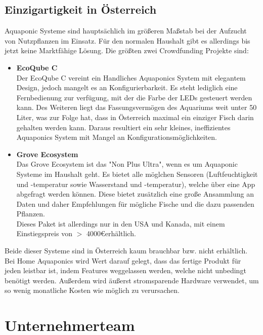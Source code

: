 \documentclass[11pt]{article}
\begin{document}
\subsection{Einzigartigkeit in \"Osterreich}
Aquaponic Systeme sind haupts\"achlich im gr\"o{\ss}eren Ma{\ss}stab bei der Aufzucht von Nutzpflanzen im Einsatz. F\"ur den normalen Haushalt gibt es allerdings bis jetzt keine Marktf\"ahige L\"osung. Die gr\"o{\ss}ten zwei Crowdfunding Projekte sind:
\begin{itemize}
	\item \textbf{EcoQube C}\\
	Der EcoQube C vereint ein Handliches Aquaponics System mit elegantem Design, jedoch mangelt es an Konfigurierbarkeit. Es steht lediglich eine Fernbedienung zur verf\"ugung, mit der die Farbe der LEDs gesteuert werden kann. Des Weiteren liegt das Fassungsverm\"ogen des Aquariums weit unter 50 Liter, was zur Folge hat, dass in \"Osterreich maximal ein einziger Fisch darin gehalten werden kann. Daraus resultiert ein sehr kleines, ineffizientes Aquaponics System mit Mangel an Konfigurationsm\"oglichkeiten. \\
	\item \textbf{Grove Ecosystem}\\
	Das Grove Ecosystem ist das "Non Plus Ultra", wenn es um Aquaponic Systeme im Haushalt geht. Es bietet alle m\"oglchen Sensoren (Luftfeuchtigkeit und -temperatur sowie Wasserstand und -temperatur), welche \"uber eine App abgefragt werden k\"onnen. Diese bietet zus\"atzlich eine gro{\ss}e Ansammlung an Daten und daher Empfehlungen f\"ur m\"ogliche Fische und die dazu passenden Pflanzen. \\
	Dieses Paket ist allerdings nur in den USA und Kanada, mit einem Einstiegspreis von $>$ 4000\euro\hspace{0.5em}erh\"altlich.
\end{itemize}
Beide dieser Systeme sind in \"Osterreich kaum brauchbar bzw. nicht erh\"altlich. Bei Home Aquaponics wird Wert darauf gelegt, dass das fertige Produkt f\"ur jeden leistbar ist, indem Features weggelassen werden, welche nicht unbedingt ben\"otigt werden. Au{\ss}erdem wird \"au{\ss}erst stromsparende Hardware verwendet, um so wenig monatliche Kosten wie m\"oglich zu verursachen.

\section{Unternehmerteam}
\end{document}
